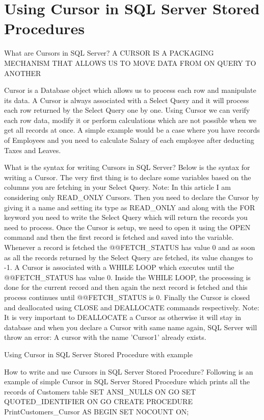 \newline
\section {Using Cursor in SQL Server Stored Procedures}

What are Cursors in SQL Server?
A CURSOR IS A PACKAGING MECHANISM THAT ALLOWS US TO MOVE DATA FROM ON QUERY TO ANOTHER

Cursor is a Database object which allows us to process each row and manipulate its data. A Cursor is always associated with a Select Query and it will process each row returned by the Select Query one by one.
Using Cursor we can verify each row data, modify it or perform calculations which are not possible when we get all records at once.
A simple example would be a case where you have records of Employees and you need to calculate Salary of each employee after deducting Taxes and Leaves.
 
 
What is the syntax for writing Cursors in SQL Server?
Below is the syntax for writing a Cursor. The very first thing is to declare some variables based on the columns you are fetching in your Select Query.
Note: In this article I am considering only READ_ONLY Cursors.
Then you need to declare the Cursor by giving it a name and setting its type as READ_ONLY and along with the FOR keyword you need to write the Select Query which will return the records you need to process.
Once the Cursor is setup, we need to open it using the OPEN command and then the first record is fetched and saved into the variable.
Whenever a record is fetched the @@FETCH_STATUS has value 0 and as soon as all the records returned by the Select Query are fetched, its value changes to -1.
A Cursor is associated with a WHILE LOOP which executes until the @@FETCH_STATUS has value 0.
Inside the WHILE LOOP, the processing is done for the current record and then again the next record is fetched and this process continues until @@FETCH_STATUS is 0.
Finally the Cursor is closed and deallocated using CLOSE and DEALLOCATE commands respectively.
Note: It is very important to DEALLOCATE a Cursor as otherwise it will stay in database and when you declare a Cursor with same name again, SQL Server will throw an error: A cursor with the name 'Cursor1' already exists.
 
Using Cursor in SQL Server Stored Procedure with example
 
 
How to write and use Cursors in SQL Server Stored Procedure?
Following is an example of simple Cursor in SQL Server Stored Procedure which prints all the records of Customers table
SET ANSI_NULLS ON
GO
SET QUOTED_IDENTIFIER ON
GO
CREATE PROCEDURE PrintCustomers_Cursor
AS
BEGIN
      SET NOCOUNT ON;
 
